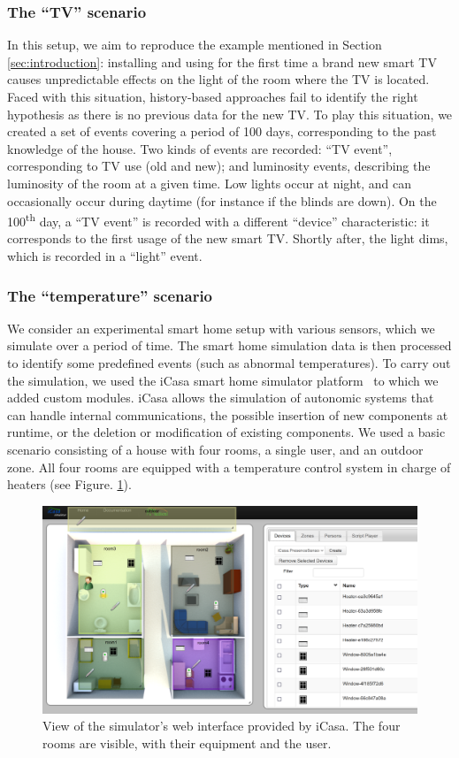 \documentclass[entropy,article,submit,moreauthors,pdftex]{Definitions/mdpi}
\begin{document}
\subsubsection{The ``TV'' scenario}
In this setup, we aim to reproduce the example mentioned in Section \ref{sec:introduction}: installing and using for the first time a brand new smart TV causes unpredictable effects on the light of the room where the TV is located. Faced with this situation, history-based approaches fail to identify the right hypothesis as there is no previous data for the new TV. To play this situation, we created a set of events covering a period of 100 days, corresponding to the past knowledge of the house. Two kinds of events are recorded: ``TV event'', corresponding to TV use (old and new); and luminosity events, describing the luminosity of the room at a given time. Low lights occur at night, and can occasionally occur during daytime (for instance if the blinds are down). On the 100\textsuperscript{th} day, a ``TV event'' is recorded with a different ``device'' characteristic: it corresponds to the first usage of the new smart TV. Shortly after, the light dims, which is recorded in a ``light'' event.

\subsubsection{The ``temperature'' scenario}
We consider an experimental smart home setup with various sensors, which we simulate over a period of time. The smart home simulation data is then processed to identify some predefined events (such as abnormal temperatures).
To carry out the simulation, we used the iCasa smart home simulator platform~\cite{lalanda_self-aware_2017} 
to which we added custom modules. iCasa
allows the simulation of autonomic systems that can handle internal communications,
the possible insertion of new components at runtime, or the deletion or modification of existing
components. We used a basic scenario consisting of a house with four rooms,
a single user, and an outdoor zone. All four rooms are equipped
with a temperature control system in charge of heaters (see Figure.
\ref{fig:view}).

\begin{figure}[!ht]
    \centering
    \includegraphics[width=.8\linewidth]{figures/icasa_interface.png}
    \caption{View of the simulator's web interface provided by iCasa. The four
        rooms are visible, with their equipment and the user.}
    \label{fig:view}
\end{figure}
\end{document}
